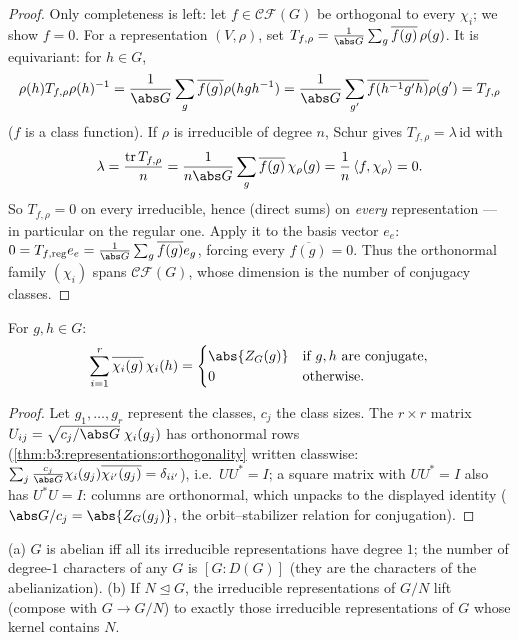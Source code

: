 \begin{proof}
Only completeness is left: let $f \in \mathcal{CF}(G)$ be
orthogonal to every $\chi_i$; we show $f = 0$. For a
representation $(V,\rho)$, set $T_{f,\rho} = \frac{1}{\abs G}
\sum_g \overline{f(g)}\,\rho(g)$. It is equivariant: for $h \in
G$,
\[
\rho(h)T_{f,\rho}\rho(h)^{-1} = \frac1{\abs G}\sum_g
\overline{f(g)}\rho(hgh^{-1})
= \frac1{\abs G}\sum_{g'}\overline{f(h^{-1}g'h)}\rho(g') =
T_{f,\rho}
\]
($f$ is a class function). If $\rho$ is irreducible of degree
$n$, Schur gives $T_{f,\rho} = \lambda\,\mathrm{id}$ with
\[
\lambda = \frac{\operatorname{tr}T_{f,\rho}}{n}
= \frac{1}{n\abs G}\sum_g \overline{f(g)}\,\chi_\rho(g)
= \frac1n\,\langle f, \chi_\rho\rangle = 0 .
\]
So $T_{f,\rho} = 0$ on every irreducible, hence (direct sums) on
\emph{every} representation --- in particular on the regular one.
Apply it to the basis vector $e_e$: $0 = T_{f,\mathrm{reg}}e_e =
\frac1{\abs G}\sum_g\overline{f(g)}e_g$, forcing every
$\overline{f(g)} = 0$. Thus the orthonormal family
$(\chi_i)$ spans $\mathcal{CF}(G)$, whose dimension is the
number of conjugacy classes.
\end{proof}

\begin{corollary}
\label{cor:b3:representations:column}
For $g, h \in G$:
\[
\sum_{i=1}^{r}\overline{\chi_i(g)}\,\chi_i(h) =
\begin{cases}
\abs{Z_G(g)} & \text{if } g, h \text{ are conjugate},\\
0 & \text{otherwise.}
\end{cases}
\]
\end{corollary}

\begin{proof}
Let $g_1, \dots, g_r$ represent the classes, $c_j$ the class
sizes. The $r \times r$ matrix $U_{ij} =
\sqrt{c_j/\abs G}\;\chi_i(g_j)$ has orthonormal rows
(\cref{thm:b3:representations:orthogonality} written classwise:
$\sum_j \frac{c_j}{\abs G}\chi_i(g_j)\overline{\chi_{i'}(g_j)} =
\delta_{ii'}$), i.e.\ $UU^* = I$; a square matrix with $UU^* =
I$ also has $U^*U = I$: columns are orthonormal, which unpacks to
the displayed identity ($\abs G/c_j = \abs{Z_G(g_j)}$, the
orbit--stabilizer relation for conjugation).
\end{proof}

\begin{proposition}
\label{prop:b3:representations:onedim}
(a) $G$ is abelian iff all its irreducible representations have
degree $1$; the number of degree-$1$ characters of any $G$ is
$[G : D(G)]$ (they are the characters of the abelianization).
(b) If $N \trianglelefteq G$, the irreducible representations of
$G/N$ lift (compose with $G \to G/N$) to exactly those
irreducible representations of $G$ whose kernel contains $N$.
\end{proposition}

